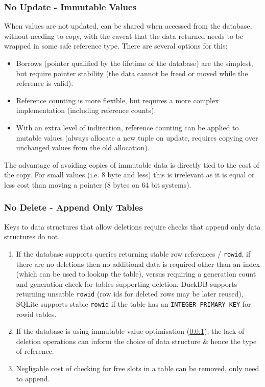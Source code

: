 \subsubsection{No Update - Immutable Values}
\label{sec:mut_opt}
When values are not updated, can be shared when accessed from the database, without needing to copy, 
with the caveat that the data returned needs to be wrapped in some safe reference type. There are several options for this:
\begin{itemize}
    \setlength\itemsep{0em}
    \item Borrows (pointer qualified by the lifetime of the database) are the simplest, but require pointer stability (the data cannot be freed or moved while the reference is valid).
    \item Reference counting is more flexible, but requires a more complex implementation (including reference counts).
    \item With an extra level of indirection, reference counting can be applied to mutable values (always allocate a new tuple on update, requires copying over unchanged values from the old allocation).
\end{itemize}
The advantage of avoiding copies of immutable data is directly tied to the cost of the copy. For small values (i.e. 8 byte and less) 
this is irrelevant as it is equal or less cost than moving a pointer (8 bytes on 64 bit systems).

\subsubsection{No Delete - Append Only Tables}
\label{sec:app_opt}
Keys to data structures that allow deletions require checks that append only data structures do not.
\begin{enumerate}
    \setlength\itemsep{0em}
    \item If the database supports queries returning stable row references / \texttt{rowid}, if there are no deletions then no additional data is required other than an index (which can be used to lookup the table), versus requiring a generation count and generation check for tables supporting deletion. DuckDB supports returning unsatble \texttt{rowid} (row ids for deleted rows may be later reused)\cite{DuckDBRowid}, SQLite supports stable \texttt{rowid} if the table has an \texttt{INTEGER PRIMARY KEY} for rowid tables\cite{SQLiteRowIDTables}.   
    \item If the database is using immutable value optimisation (\ref{sec:mut_opt}), the lack of deletion operations can inform the choice of data structure \& hence the type of reference. 
    \item Negligable cost of checking for free slots in a table can be removed, only need to append.
\end{enumerate}


